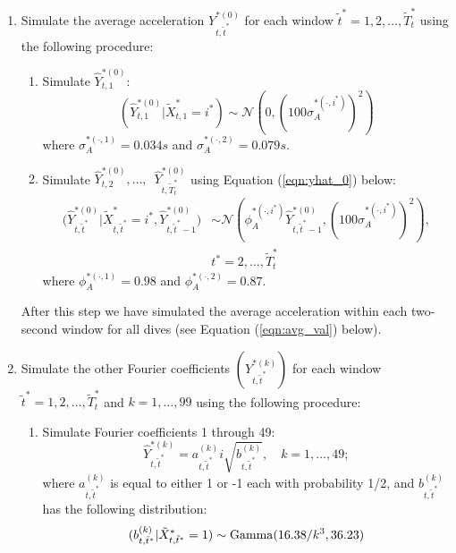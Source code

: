 \begin{enumerate}
\item Simulate the average acceleration $Y^{*(0)}_{t,\tilde t^*}$ for each window $\tilde t^* = 1,2,\ldots,\tilde T^*_t$ using the following procedure:
\begin{enumerate}
    \item Simulate $\hat{Y}^{*(0)}_{t,1}$:
    $$
    	(\hat{Y}^{*(0)}_{t,1}|\tilde X^*_{t,1} = i^*) \sim \mathcal{N} \left(0, \left(100\sigma_A^{*(\cdot,i^*)}\right)^2 \right)
    $$
    where $\sigma_A^{*(\cdot,1)} = 0.034s$ and $\sigma_A^{*(\cdot,2)} = 0.079s$. 
    \item Simulate $\hat{Y}^{*(0)}_{t,2}, \ldots,\enspace \hat{Y}^{*(0)}_{t,\tilde T^*_t}$ using Equation (\ref{eqn:yhat_0}) below:
    \begin{align}	
        \Big(\hat{Y}^{*(0)}_{t,\tilde t^*}|\tilde X^*_{t,\tilde t^*} = i^*,\hat{Y}^{*(0)}_{t,\tilde t^*-1}\Big) &\sim \mathcal{N} \left(\phi_A^{*(\cdot,i^*)} \hat{Y}^{*(0)}_{t,\tilde t^*-1}, \left(100\sigma_A^{*(\cdot,i^*)}\right)^2 \right), \nonumber \\
        &t^* = 2,\ldots, \tilde T^*_t
    	\label{eqn:yhat_0}
    \end{align}
    where $\phi_A^{*(\cdot,1)} = 0.98$ and $\phi_A^{*(\cdot,2)} = 0.87$. 
    \end{enumerate}
    After this step we have simulated the average acceleration within each two-second window for all dives (see Equation (\ref{eqn:avg_val}) below).
    \item Simulate the other Fourier coefficients $\left(Y^{*(k)}_{t,\tilde t^*}\right)$ for each window $\tilde t^* = 1,2,\ldots,\tilde T^*_t$ and $k = 1,\ldots,99$ using the following procedure:
    \begin{enumerate}
    \item Simulate Fourier coefficients 1 through 49:
    \begin{equation}
        \hat{Y}^{*(k)}_{t,\tilde t^*} = a_{t,\tilde t^*}^{(k)} i\sqrt{b^{(k)}_{t,\tilde t^*}}, \quad k = 1,\ldots,49;
        \label{eqn:abYhat}
    \end{equation}
    where $a^{(k)}_{t,\tilde t^*}$ is equal to either 1 or -1 each with probability 1/2, and $b^{(k)}_{t,\tilde t^*}$ has the following distribution:
    \begin{align}
    \begin{split}
    	(b^{(k)}_{t,\tilde t^*}|\tilde X^*_{t,\tilde t^*} = 1) &\sim {\rm{Gamma}}(16.38/k^3, 36.23) \\

\end{split}
\end{align}
\end{enumerate}
\end{enumerate}
